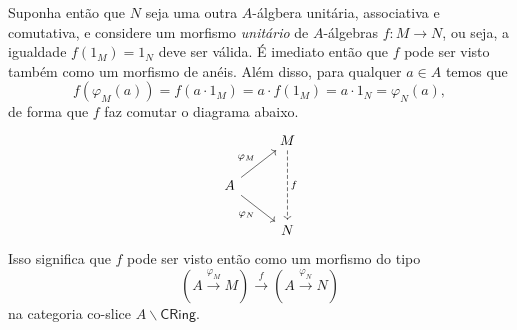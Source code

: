 Suponha então que $N$ seja uma outra $A$-álgbera unitária, associativa e comutativa, e considere um morfismo \emph{unitário} de $A$-álgebras $f: M \to N$, ou seja, a igualdade $f(1_M) = 1_N$ deve ser válida.
É imediato então que $f$ pode ser visto também como um morfismo de anéis.
Além disso, para qualquer $a \in A$ temos que
\begin{displaymath}
  f(\varphi_M(a)) = f(a \cdot 1_M) = a \cdot f(1_M) = a \cdot 1_N = \varphi_N(a),
\end{displaymath}
de forma que $f$ faz comutar o diagrama abaixo.
\begin{displaymath}
  \begin{tikzcd}
    & M
    \arrow[dd, dashed, "f"]
    \\ A
    \arrow[ru, "\varphi_M"]
    \arrow[rd, "\varphi_N" swap]
    \\ & N
  \end{tikzcd}
\end{displaymath}
Isso significa que $f$ pode ser visto então como um morfismo do tipo
\begin{displaymath}
  (A \overset{\varphi_M}{\to} M) \overset{f}{\longrightarrow}
  (A \overset{\varphi_N}{\to} N)
\end{displaymath}
na categoria co-slice $A \backslash \mathsf{CRing}$.



